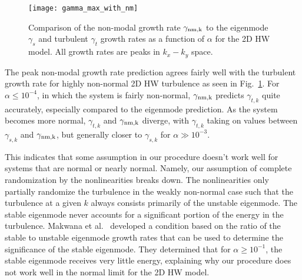 \documentclass[twocolumn,showkeys,superscriptaddress]{revtex4}
\begin{document}

\begin{figure}
\centerline{\texttt{[image: gamma\_max\_with\_nm]}}
\caption{Comparison of the non-modal growth rate $\gamma_{\rm{nm},k}$ to the eigenmode $\gamma_{s}$ and turbulent $\gamma_{t}$ growth rates as a function of $\alpha$
for the 2D HW model. All growth rates are peaks in $k_x-k_y$ space.}
\label{gamma_max_with_nm}
\end{figure}

The peak non-modal growth rate prediction agrees fairly well with the turbulent growth rate for highly non-normal 2D HW turbulence as seen in Fig.~\ref{gamma_max_with_nm}. For $\alpha \le 10^{-4}$,
in which the system is fairly non-normal, $\gamma_{\rm{nm},k}$ predicts $\gamma_{t,k}$ quite accurately, especially compared to the eigenmode prediction. 
As the system becomes more normal, $\gamma_{t,k}$ and $\gamma_{\rm{nm},k}$ diverge, with $\gamma_{t,k}$ taking on values between $\gamma_{s,k}$ and $\gamma_{\rm{nm},k}$, 
but generally closer to $\gamma_{s,k}$ for $\alpha \gg 10^{-3}$. 

This indicates that some assumption in our procedure doesn't work well for systems that are normal or nearly normal. Namely, our assumption
of complete randomization by the nonlinearities breaks down. The nonlinearities only partially randomize the turbulence in the weakly non-normal case such that
the turbulence at a given $k$ always consists primarily of the unstable eigenmode. The stable eigenmode never accounts for a significant portion of the energy in the turbulence.
Makwana et al.~\cite{makwana2011} developed a condition based on the ratio of the stable to unstable eigenmode growth rates that can be used to determine the significance of the stable eigenmode. 
They determined that for $\alpha \ge 10^{-1}$, the stable eigenmode receives very little energy, explaining why our procedure does not work well in the normal limit for the 2D HW model.
\end{document}
